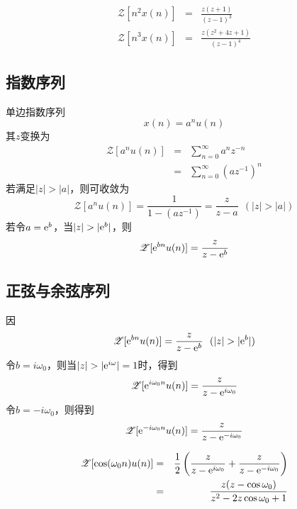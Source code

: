 \documentclass[12pt,a4paper]{article}
\begin{document}
\begin{eqnarray*}
\mathscr{Z}[n^2 x(n)] &=& \frac{z(z+1)}{(z-1)^3} \\
\mathscr{Z}[n^3 x(n)] &=& \frac{z(z^2+4z+1)}{(z-1)^4}
\end{eqnarray*}

\subsection{指数序列}
单边指数序列
\begin{equation}
x(n) = a^n u(n)
\end{equation}
其$z$变换为
\begin{eqnarray*}
\mathscr{Z}[a^n u(n)] &=& \sum_{n=0}^{\infty} a^n z^{-n} \\
&=& \sum_{n=0}^{\infty} (a z^{-1})^n
\end{eqnarray*}
若满足$|z| > |a|$，则可收敛为
\begin{equation}
\mathscr{Z}[a^n u(n)] = \frac{1}{1-(az^{-1})} = \frac{z}{z-a}  ~~(|z| > |a|)
\end{equation}
若令$a = {\rm e}^b$，当$|z| > |{\rm e}^b|$，则
\begin{equation*}
\mathscr{Z}[{\rm e}^{bn} u(n)] = \frac{z}{z-{\rm e}^b}
\end{equation*}


\subsection{正弦与余弦序列}
因
\begin{equation*}
\mathscr{Z}[{\rm e}^{bn} u(n)] = \frac{z}{z-{\rm e}^b}  ~~(|z| > |{\rm e}^b|)
\end{equation*}
令$b = i\omega_0$，则当$|z| > |{\rm e}^{i\omega}| = 1$时，得到
\begin{equation*}
\mathscr{Z}[{\rm e}^{i\omega_0 n} u(n)] = \frac{z}{z -{\rm e}^{i\omega_0}}
\end{equation*}
令$b = -i\omega_0$，则得到
\begin{equation*}
\mathscr{Z}[{\rm e}^{-i\omega_0 n} u(n)] = \frac{z}{z -{\rm e}^{-i\omega_0}}
\end{equation*}

\begin{eqnarray*}
\mathscr{Z}[\cos(\omega_0 n) u(n)] &=& \frac{1}{2} \left(\frac{z}{z -{\rm e}^{i\omega_0}} + \frac{z}{z -{\rm e}^{-i\omega_0}}  \right) \\
&=& \frac{z(z-\cos \omega_0)}{z^2 -2z\cos \omega_0 +1}
\end{eqnarray*}
\end{document}
